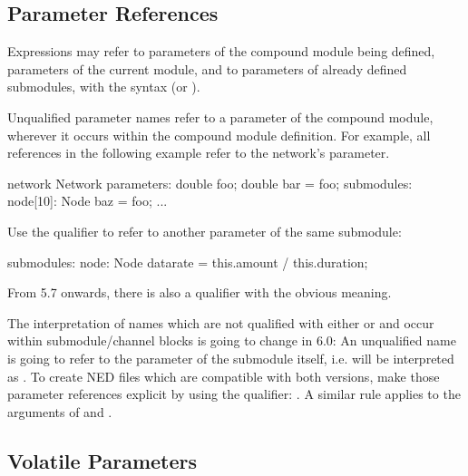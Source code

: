 
\subsection{Parameter References}
\label{sec:ned-lang:parameter-references}

Expressions may refer to parameters of the compound module being defined,
parameters of the current module, and to parameters of already defined
submodules, with the syntax  (or
).

Unqualified parameter names refer to a parameter of the compound module,
wherever it occurs within the compound module definition. For example,
all  references in the following example refer to the network's
 parameter.

\begin{ned}
network Network
{
    parameters:
        double foo;
        double bar = foo;
    submodules:
        node[10]: Node {
            baz = foo;
        }
    ...
}
\end{ned}

Use the  qualifier to refer to another parameter of the same submodule:

\begin{ned}
    submodules:
        node: Node {
            datarate = this.amount / this.duration;
    }
\end{ned}

From {\opp} 5.7 onwards, there is also a  qualifier with the obvious meaning.

\begin{note}
    The interpretation of names which are not qualified with either
     or  and occur within submodule/channel
    blocks is going to change in {\opp} 6.0: An unqualified name  is
    going to refer to the parameter of the submodule itself, i.e. will be
    interpreted as . To create NED files which are compatible with
    both versions, make those parameter references explicit by using the
     qualifier: . A similar rule applies to the
    arguments of  and  .
\end{note}


\subsection{Volatile Parameters}
\label{sec:ned-lang:volatile}

